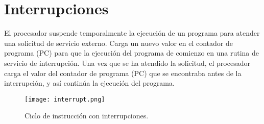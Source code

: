 \documentclass{article}
\begin{document}
\newpage

\section*{Interrupciones}
El procesador suspende temporalmente la ejecuci\'{o}n de un programa para atender una
solicitud de servicio externo. Carga un nuevo valor en el contador de programa (PC)
para que la ejecuci\'{o}n del programa de comienzo en una rutina de servicio de
interrupci\'{o}n. Una vez que se ha atendido la solicitud, el procesador carga el valor
del contador de programa (PC) que se encontraba antes de la interrupci\'{o}n, y as\'{i}
contin\'{u}a la ejecuci\'{o}n del programa.

\begin{figure}[h]
    \centering
    \texttt{[image: interrupt.png]}
    \caption{Ciclo de instrucci\'{o}n con interrupciones.
    \cite{stallings2006organización}}
\end{figure}



\end{document}
